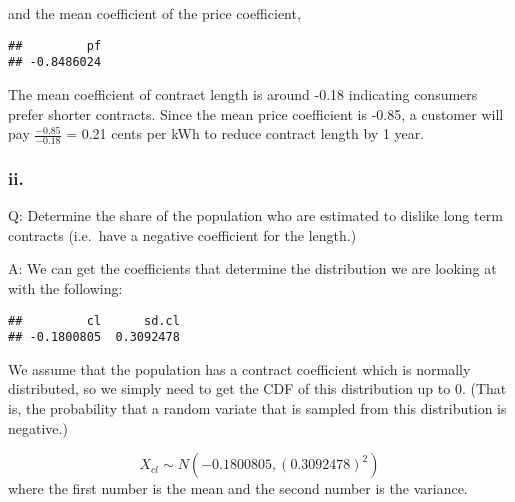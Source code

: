 \documentclass[
]{article}
\newenvironment{Shaded}{\begin{snugshade}}{\end{snugshade}}
\newcommand{\DecValTok}[1]{\textcolor[rgb]{0.00,0.00,0.81}{#1}}
\newcommand{\KeywordTok}[1]{\textcolor[rgb]{0.13,0.29,0.53}{\textbf{#1}}}
\newcommand{\NormalTok}[1]{#1}
\newcommand{\OperatorTok}[1]{\textcolor[rgb]{0.81,0.36,0.00}{\textbf{#1}}}
\newcommand{\StringTok}[1]{\textcolor[rgb]{0.31,0.60,0.02}{#1}}
\begin{document}
and the mean coefficient of the price coefficient,

\begin{Shaded}
\end{Shaded}

\begin{verbatim}
##         pf 
## -0.8486024
\end{verbatim}

The mean coefficient of contract length is around -0.18 indicating
consumers prefer shorter contracts. Since the mean price coefficient is
-0.85, a customer will pay \linebreak \(\frac{-0.85}{-0.18}\) = 0.21
cents per kWh to reduce contract length by 1 year.

\hypertarget{ii.-4}{%
\subsubsection{ii.}\label{ii.-4}}

Q: Determine the share of the population who are estimated to dislike
long term contracts (i.e.~have a negative coefficient for the length.)

A: We can get the coefficients that determine the distribution we are
looking at with the following:

\begin{Shaded}
\end{Shaded}

\begin{verbatim}
##         cl      sd.cl 
## -0.1800805  0.3092478
\end{verbatim}

We assume that the population has a contract coefficient which is
normally distributed, so we simply need to get the CDF of this
distribution up to 0. (That is, the probability that a random variate
that is sampled from this distribution is negative.)

\begin{equation*}
X_{cl}\sim N\left(-0.1800805, \left(0.3092478\right)^{2}\right)
\end{equation*} where the first number is the mean and the second number
is the variance.
\end{document}
